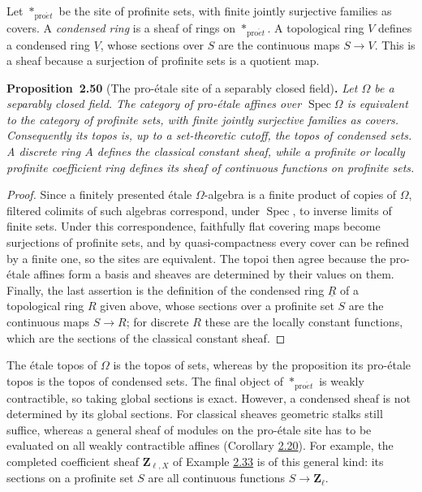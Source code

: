 \documentclass[11pt]{article}
\newenvironment{bpstatement}[2]{\par\addvspace{0.6\baselineskip}\noindent\textbf{#1}#2\textbf{.}\enspace\ignorespaces}
  {\par\addvspace{0.4\baselineskip}}
\newenvironment{bpstatementit}[2]{\begin{bpstatement}{#1}{#2}\itshape\ignorespaces}{\end{bpstatement}}
\begin{document}
Let \(*_{\mathrm{pro}\acute{e}t}\) be the site of profinite sets, with finite jointly surjective families as covers. A \emph{condensed ring} is a sheaf of rings on \(*_{\mathrm{pro}\acute{e}t}\). A topological ring \(V\) defines a condensed ring \(\underline V\), whose sections over \(S\) are the continuous maps \(S\to V\). This is a sheaf because a surjection of profinite sets is a quotient map.

\label{bp153}%
\begin{bpstatementit}{Proposition~2.50}{ (The pro-étale site of a separably closed field)}
Let \(\Omega\) be a separably closed field. The category of pro-étale affines over \(\operatorname{Spec}\Omega\) is equivalent to the category of profinite sets, with finite jointly surjective families as covers. Consequently its topos is, up to a set-theoretic cutoff, the topos of condensed sets. A discrete ring \(A\) defines the classical constant sheaf, while a profinite or locally profinite coefficient ring defines its sheaf of continuous functions on profinite sets.
\end{bpstatementit}

\begin{proof}[{Proof}]\label{bp154}%
Since a finitely presented étale \(\Omega\)-algebra is a finite product of copies of \(\Omega\), filtered colimits of such algebras correspond, under \(\operatorname{Spec}\), to inverse limits of finite sets. Under this correspondence, faithfully flat covering maps become surjections of profinite sets, and by quasi-compactness every cover can be refined by a finite one, so the sites are equivalent. The topoi then agree because the pro-étale affines form a basis and sheaves are determined by their values on them. Finally, the last assertion is the definition of the condensed ring \(\underline R\) of a topological ring \(R\) given above, whose sections over a profinite set \(S\) are the continuous maps \(S\to R\); for discrete \(R\) these are the locally constant functions, which are the sections of the classical constant sheaf.
\end{proof}

\label{bp155}%
The étale topos of \(\Omega\) is the topos of sets, whereas by the proposition its pro-étale topos is the topos of condensed sets. The final object of \(*_{\mathrm{pro}\acute{e}t}\) is weakly contractible, so taking global sections is exact. However, a condensed sheaf is not determined by its global sections. For classical sheaves geometric stalks still suffice, whereas a general sheaf of modules on the pro-étale site has to be evaluated on all weakly contractible affines (Corollary \hyperref[bp59]{2.20}). For example, the completed coefficient sheaf \(\mathbf Z_{\ell,X}\) of Example \hyperref[bp97]{2.33} is of this general kind: its sections on a profinite set \(S\) are all continuous functions \(S\to\mathbf Z_\ell\).
\end{document}
